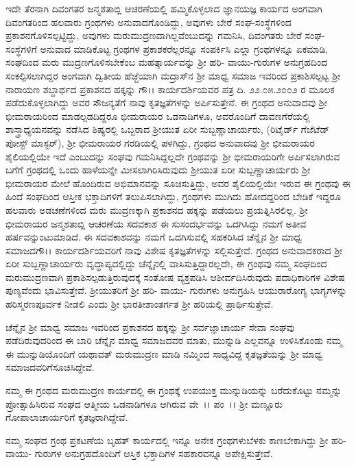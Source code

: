 ಇದೇ ತೆರನಾಗಿ ದಿವಂಗತರ ಜನ್ಮಶತಾಬ್ಲಿ ಆಚರಣೆಯಲ್ಲಿ ಹಮ್ಮಿಕೊಳ್ಳಲಾದ ಜ್ಞಾನಯಜ್ಞ ಕಾರ್ಯದ ಅಂಗವಾಗಿ ದಿವಂಗತರಿಂದ ಹಲವಾರು ಗ್ರಂಥಗಳು ಅನುವಾದಗೊಂಡಿದ್ದು, ಅವುಗಳು ಬೇರೆ ಸಂಘ-ಸಂಸ್ಥೆಗಳಿಂದ ಪ್ರಕಾಶನಗೊಳಿಸಲ್ಪಟ್ಟಿದ್ದು, ಅವುಗಳು ಮರುಮುದ್ರಣವಾಗಿಲ್ಲವೆಂಬುದನ್ನು ಗಮನಿಸಿ, ದಿವಂಗತರು ಬೇರೆ ಸಂಘ-ಸಂಸ್ಥೆಗಳಿಗೆ ಅನುವಾದ ಮಾಡಿಕೊಟ್ಟ ಗ್ರಂಥಗಳ ಪ್ರಕಾಶಕರೆಲ್ಲರನ್ನೂ ಸಂಪರ್ಕಿಸಿ ಎಲ್ಲಾ ಗ್ರಂಥಗಳನ್ನೂ ಏಕಮಾಡಿ, ಸಂಘದಿಂದ ಮರು ಮುದ್ರಣಗೊಳಿಸಬೇಕೆಂಬ ಮಹತ್ಕಾರ್ಯವನ್ನು ಶ‍್ರೀ ಹರಿ- ವಾಯು-\-ಗುರುಗಳ ಅನುಗ್ರಹದಿಂದ ಸಂಕಲ್ಪಿಸಲಾಗಿದ್ದರ ಅಂಗವಾಗಿ ದ್ವಿತೀಯ ಹೆಜ್ಜೆಯಾಗಿ ಮದ್ರಾಸ್‌ನ ಶ‍್ರೀ ಮಾಧ್ವ ಸಮಾಜ ಇವರಿಂದ ಪ್ರಕಾಶಿಸಲ್ಪಟ್ಟ ಶ‍್ರೀ ನಾರಾಯಣ ಶಬ್ದಾರ್ಥದ ಪ್ರಕಾಶನದ ಹಕ್ಕನ್ನು ಗೌ।। ಕಾರ್ಯದರ್ಶಿಯವರ ಪತ್ರ ದಿ. ೨೨.೦೫.೨೦೦೨ ರ ಮೂಲಕ ಪಡೆದುಕೊಳ್ಳಲಾಗಿದ್ದು ಅವರ ಸೌಜನ್ಯತೆಗೆ ನಾವು ಕೃತಜ್ಞತೆಗಳನ್ನು ಅರ್ಪಿಸುತ್ತೇನೆ. ಈ ಗ್ರಂಥದ ಅನುವಾದವು ಶ‍್ರೀ ಭೀಮರಾಯರಿಂದ ಮಾಡಲ್ಪಡದಿದ್ದರೂ ಭೀಮರಾಯರ ಒಡನಾಡಿಗಳೂ, ಅವರೊಂದಿಗೆ ದಾವಣಗೆರೆಯಲ್ಲಿ ಶಾಸ್ತ್ರಾಧ್ಯಯನವನ್ನು ನಡೆಸಿದ ಶಿಷ್ಯರಲ್ಲಿ ಒಬ್ಬರಾದ ಶ‍್ರೀಯುತ ಏರೀ ಸುಬ್ಬಣ್ಣಾಚಾರ್ಯರು, (ರಿಟೈರ್ಡ್ ಗೆಜೆಟೆಡ್ ಪೋಸ್ಟ್ ಮಾಸ್ಟರ್), ಶ‍್ರೀ ಭೀಮರಾಯರ ಗರಡಿಯಲ್ಲಿ ಪಳಗಿದ್ದು, ಗ್ರಂಥದ ಅನುವಾದವು ಶ‍್ರೀ ಭೀಮರಾಯರ ಶೈಲಿ\-ಯಲ್ಲಿಯೇ ಇದೆ ಎಂಬುದನ್ನು ಸಂಘವು ಗಮನಿಸಿದ್ದಲ್ಲದೇ ಗ್ರಂಥವನ್ನು ಶ‍್ರೀ ಭೀಮ\-ರಾಯರಿಗೇ ಅರ್ಪಿಸಲಾಗಿರುವ ಬಗೆಗೆ ಗ್ರಂಥದಲ್ಲಿ ಒಂದು ಹಾಳೆಯನ್ನೇ ಮೀಸಲಾಗಿರಿಸಿರುವುದು ಶ‍್ರೀಯುತ ಏರೀ ಸುಬ್ಬಣ್ಣಾಚಾರ್ಯರು ಶ‍್ರೀ ಭೀಮರಾಯರ ಮೇಲೆ ಹೊಂದಿರುವ ಅಭಿಮಾನವನ್ನು ಸೂಚಿಸುತ್ತಿದ್ದು, ಅವರ ಶೈಲಿಯಲ್ಲಿಯೇ ಇರುವ ಈ ಗ್ರಂಥವು ಈ ಹಿಂದೆ ಸಂಘದಿಂದ ಆಸ್ತೀಕ ಭಕ್ತಾದಿಗಳಿಗೆ ತಲುಪಿಸಲಾಗಿದ್ದು, ಗ್ರಂಥಗಳು ಮುಗಿದು ಹೋದದ್ದ\-ರಿಂದ ಬೇಡಿಕೆ ಇದ್ದರೂ ಹಲವಾರು ಅಡಚಣೆಗಳಿಂದ ಮರು ಮುದ್ರಣಕ್ಕಾಗಿ ಪ್ರಕಾಶನದ ಹಕ್ಕನ್ನು ಪಡೆಯಲು ಪ್ರಯತ್ನಿಸಿರಲಿಲ್ಲ. ಶ‍್ರೀ ಭೀಮರಾಯರ ಜನ್ಮಶತಾಬ್ಲಿ ಆಚರಣೆಯ ಸದವಕಾಶ ಈ ಸುಸಂದರ್ಭವನ್ನು ಒದಗಿಸಿದ್ದು ನಮಗೆ ಅತೀವ ಹರ್ಷವನ್ನುಂಟುಮಾಡಿದೆ. ಈ ಸದವಕಾಶವನ್ನು ನಮಗೆ ಒದಗಿಸುವಲ್ಲಿ ಸಹಕರಿಸಿದ ಚೆನ್ನೈನ ಶ‍್ರೀ ಮಾಧ್ವ ಸಮಾಜದ\break ಗೌ।। ಕಾರ್ಯದರ್ಶಿ\-ಯವರಿಗೆ ನಾವು ವಿಶೇಷ ಕೃತಜ್ಞತೆಗಳನ್ನು ಸಲ್ಲಿಸುತ್ತೇವೆ. ಗ್ರಂಥದ ಅನುವಾದಕರಾದ ಶ‍್ರೀ ಏರೀ ಸುಬ್ಬಣ್ಣಾಚಾರ್ಯರು ವೃದ್ಧಾಪ್ಯದಲ್ಲಿದ್ದು ಚೆನ್ನೈನಲ್ಲಿ ವಾಸಿಸುತ್ತಿದ್ದಾರಲ್ಲದೇ, ಈ ಗ್ರಂಥವು ನಮ್ಮ ಸಂಘದಿಂದ ಮರುಮುದ್ರಣವಾಗಿ ಪ್ರಕಾಶಿಸಲ್ಪಡುತ್ತಿರುವುದಕ್ಕೆ ಸಂತೋಷ ವ್ಯಕ್ತಪಡಿಸಿ ಆಶೀರ್ವದಿಸಿರುವುದು ಪದಾಧಿಕಾರಿಗಳ ವಿಶೇಷ ಪುಣ್ಯವೆಂದು ಭಾವಿಸುತ್ತೇವೆ. ಶ‍್ರೀಯುತರಿಗೆ ಶ‍್ರೀ ಹರಿ- ವಾಯು- ಗುರುಗಳು ಅನುಗ್ರಹಿಸಿ ಆಯುರಾರೋಗ್ಯ ಭಾಗ್ಯಗಳನ್ನು ಹರಿಸ್ಮರಣಪೂರ್ವಕ ನೀಡಲಿ ಎಂದು ಶ‍್ರೀ ಭಾರತೀಶಾಂತರ್ಗತ ಶ‍್ರೀ ಹರಿಯಲ್ಲಿ ಪ್ರಾರ್ಥಿಸುತ್ತೇವೆ.

ಚೆನ್ನೈನ ಶ‍್ರೀ ಮಾಧ್ವ ಸಮಾಜ ಇವರಿಂದ ಪ್ರಕಾಶನದ ಹಕ್ಕನ್ನು ಶ‍್ರೀ ಸರ್ವಜ್ಞಾಚಾರ್ಯ ಸೇವಾ ಸಂಘವು ಪಡೆದಿರುವುದರಿಂದ ಈ ಬಾರಿ ಚೆನ್ನೈನ ಮಾಧ್ವ ಸಮಾಜದವರ ಮಾತು, ಮುನ್ನುಡಿ ಎಲ್ಲವನ್ನೂ ಉಳಿಸಿಕೊಂಡು ನಮ್ಮ ಈ ಮುನ್ನುಡಿಯೊಂದಿಗೆ ಯಥಾವತ್ ಮರುಮುದ್ರಣ ಮಾಡಿ ನಮ್ಮಿಂದ ಸಾಧ್ಯವಿದ್ದ ಕೃತಜ್ಞತೆಯನ್ನು ಶ‍್ರೀ ಮಾಧ್ವ ಸಮಾಜದವರಿಗೆ\break ಸೂಚಿಸಿದ್ದೇವೆ.

ನಮ್ಮ ಈ ಗ್ರಂಥದ ಮರುಮುದ್ರಣ ಕಾರ್ಯದಲ್ಲಿ ಈ ಗ್ರಂಥಕ್ಕೆ ಉಪಯುಕ್ತ ಮುನ್ನುಡಿಯನ್ನು ಬರೆದುಕೊಟ್ಟು ನಮ್ಮನ್ನು ಪ್ರೋತ್ಸಾಹಿಸಿರುವ ಸಂಘದ ಆತ್ಮೀಯ ಒಡನಾಡಿಗಳೂ ಆಗಿರುವ ವೇ~।। ಪಂ~।। ಶ‍್ರೀ ಮಣ್ಣೂರು ಗೋಪಾಲಾಚಾರ್ಯರಿಗೆ ಕೃತಜ್ಞರಾಗಿದ್ದೇವೆ.

ನಮ್ಮ ಸಂಘದ ಗ್ರಂಥ ಪ್ರಕಟಣೆಯ ಬೃಹತ್ ಕಾರ್ಯದಲ್ಲಿ ಇನ್ನೂ ಅನೇಕ ಗ್ರಂಥಗಳು\break ಬೆಳಕು ಕಾಣಬೇಕಾಗಿದ್ದು ಶ‍್ರೀ ಹರಿ- ವಾಯು- ಗುರುಗಳ ಅನುಗ್ರಹದೊಂದಿಗೆ ಆಸ್ತಿಕ ಭಕ್ತಾದಿಗಳ ಸಹಕಾರವನ್ನೂ ಅಪೇಕ್ಷಿಸುತ್ತೇವೆ.


